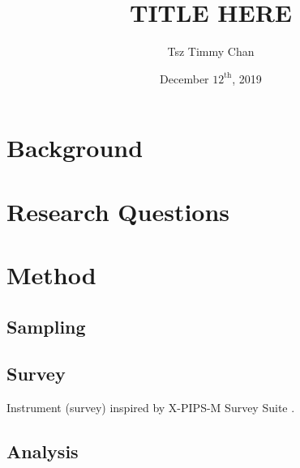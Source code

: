 \documentclass{LSRIarticle}
\title{TITLE HERE}	%
\author{Tsz Timmy Chan}	%
\date{December $12^{\text{th}}$, 2019}
\begin{document}
\section{Background}


\section{Research Questions}

\section{Method}
\subsection{Sampling}
\subsection{Survey}
Instrument (survey) inspired by X-PIPS-M Survey Suite \parencite{apkarianXPIPSMSurveySuite2019}.
\subsection{Analysis}





\end{document}
